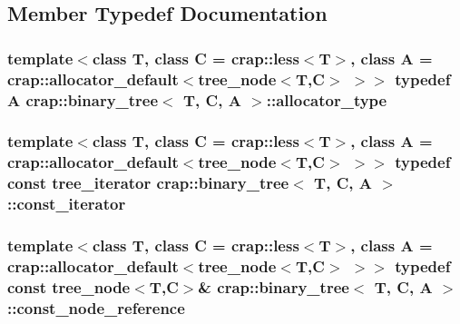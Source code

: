 \subsection{Member Typedef Documentation}
\hypertarget{classcrap_1_1binary__tree_a0f57ad15240003da41b5893f4dd16d89}{
\subsubsection[{allocator\-\_\-type}]{\setlength{\rightskip}{0pt plus 5cm}template$<$class T, class C = crap\-::less$<$\-T$>$, class A = crap\-::allocator\-\_\-default$<$tree\-\_\-node$<$\-T,\-C$>$ $>$$>$ typedef A {\bf crap\-::binary\-\_\-tree}$<$ T, C, A $>$\-::{\bf allocator\-\_\-type}}}\label{classcrap_1_1binary__tree_a0f57ad15240003da41b5893f4dd16d89}
\hypertarget{classcrap_1_1binary__tree_aa9b9a8c0dd4bb6c574ea0526040e7c50}{
\subsubsection[{const\-\_\-iterator}]{\setlength{\rightskip}{0pt plus 5cm}template$<$class T, class C = crap\-::less$<$\-T$>$, class A = crap\-::allocator\-\_\-default$<$tree\-\_\-node$<$\-T,\-C$>$ $>$$>$ typedef const {\bf tree\-\_\-iterator} {\bf crap\-::binary\-\_\-tree}$<$ T, C, A $>$\-::{\bf const\-\_\-iterator}}}\label{classcrap_1_1binary__tree_aa9b9a8c0dd4bb6c574ea0526040e7c50}
\hypertarget{classcrap_1_1binary__tree_a2a0da5e341fa47ba7c7f47d784a6761b}{
\subsubsection[{const\-\_\-node\-\_\-reference}]{\setlength{\rightskip}{0pt plus 5cm}template$<$class T, class C = crap\-::less$<$\-T$>$, class A = crap\-::allocator\-\_\-default$<$tree\-\_\-node$<$\-T,\-C$>$ $>$$>$ typedef const {\bf tree\-\_\-node}$<$T,C$>$\& {\bf crap\-::binary\-\_\-tree}$<$ T, C, A $>$\-::{\bf const\-\_\-node\-\_\-reference}}}\label{classcrap_1_1binary__tree_a2a0da5e341fa47ba7c7f47d784a6761b}
